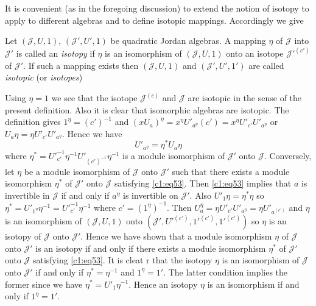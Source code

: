 It is convenient (as in the foregoing discussion) to extend the notion
of isotopy to apply to different algebras and to define isotopic
mappings. Accordingly we give
\begin{defn}\pageoriginale
Let $(\mathscr{J},U,1)$, $(\mathscr{J}',U',1)$ be quadratic Jordan
algebras. A mapping $\eta$ of $\mathscr{J}$ into $\mathscr{J}'$ is
called an {\em isotopy} if $\eta$ is an isomorphism of
$(\mathscr{J},U,1)$ onto an isotope $\mathscr{J}'^{(c')}$ of
$\mathscr{J}'$. If such a mapping exists then $(\mathscr{J},U,1)$ and
$(\mathscr{J}',U',1')$ are called {\em isotopic} (or {\em isotopes})

Using $\eta=1$ we see that the isotope $\mathscr{J}^{(c)}$ and
$\mathscr{J}$ are isotopic in the sense of the present
definition. Also it is clear that isomorphic algebras are
isotopic. The definition gives $1^{\eta}=(c')^{-1}$ and
$(xU_a)^{\eta}=x^{\eta}U'_{a^{\eta}}(c')=x^{\eta}U'_{c'}U'_{a^{\eta}}$
or $U_a\eta=\eta U'_{c'}U'_{a^{\eta}}$. Hence we have
\begin{equation*}
U'_{a^{\eta}}=\eta^{\ast}U_a\eta\tag{53}\label{c1:eq53}
\end{equation*}
where $\eta^{\ast}=U'^{-1}_{c'}\eta^{-1}U'_{(c')^{-1}}\eta^{-1}$ is a
module isomorphism of $\mathscr{J}'$ onto $\mathscr{J}$. Conversely,
let $\eta$ be a module isomorphism of $\mathscr{J}$ onto
$\mathscr{J}'$ such that there exists a module isomorphism
$\eta^{\ast}$ of $\mathscr{J}'$ onto $\mathscr{J}$ satisfying
    \eqref{c1:eq53}. Then \eqref{c1:eq53} implies that $a$ is
    invertible in $\mathscr{J}$ if 
    and only if $a^{\eta}$ is invertible on $\mathscr{J}'$. Also
    $U'_{1}\eta=\eta^{\ast}\eta$ so $\eta^{\ast}=U'_{1
    ^\eta}\eta^{-1}=U'^{-1}_{c'}\eta^{-1}$ where
  $c'=(1^{\eta})^{-1}$. Then $U_a^{\eta}=\eta U'_{c'}U'_{a^{\eta}}=\eta
  U'_{a^{(c')}}$ and $\eta$ is an isomorphism of $(\mathscr{J},U,1)$
  onto $(\mathscr{J}',U'^{(c')},1'^{(c')},1'^{(c')})$ so $\eta$ is an
  isotopy of $\mathscr{J}$ onto $\mathscr{J}'$. Hence we have shown
  that a module isomorphism $\eta$ of $\mathscr{J}$ onto
  $\mathscr{J}'$ is an isotopy if and only if there exists a module
  isomorphism $\eta^{\ast}$ of $\mathscr{J}'$ onto $\mathscr{J}$
  satisfying \eqref{c1:eq53}. It is cleat r that the isotopy $\eta$ is an
  isomorphism of $\mathscr{J}$ onto $\mathscr{J}'$ if and only if
  $\eta^{\ast}=\eta^{-1}$ and $1^{\eta}=1'$. The latter condition
  implies the former since we have\pageoriginale
  $\eta^{\ast}=U'_1\eta^{-1}$. Hence an isotopy $\eta$ is an
  isomorphism if and only if $1^{\eta}=1'$.


\end{defn}

